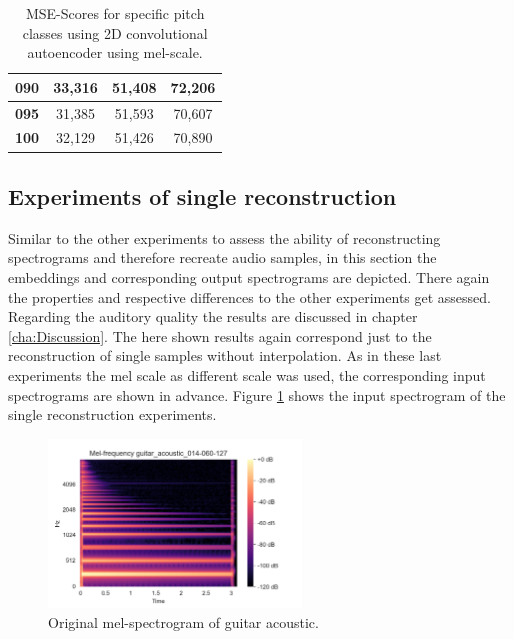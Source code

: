 \begin{table}[htb!]
\begin{tabular}{|c|c|c|c|}
\textbf{090}   & 33,316                 & 51,408                 & 72,206                 \\ \hline
\textbf{095}   & 31,385                 & 51,593                 & 70,607                 \\ \hline
\textbf{100}   & 32,129                 & 51,426                 & 70,890                 \\ \hline
\end{tabular}
\caption{MSE-Scores for specific pitch classes using 2D convolutional autoencoder using mel-scale.}
\label{tab:res_scores_2D_pitch_mel}
\end{table}

\subsection{Experiments of single reconstruction}
Similar to the other experiments to assess the ability of reconstructing spectrograms and therefore recreate audio samples, in this section the embeddings and corresponding output spectrograms are depicted. There again the properties and respective differences to the other experiments get assessed. Regarding the auditory quality the results are discussed in chapter \ref{cha:Discussion}. The here shown results again correspond just to the reconstruction of single samples without interpolation. As in these last experiments the mel scale as different scale was used, the corresponding input spectrograms are shown in advance. Figure \ref{fig:res_2D_mel_guit} shows the input spectrogram of the single reconstruction experiments.

\begin{figure}[htb!]
    \centering
    \includegraphics[width=0.60\textwidth]{images/results/mel_guitar_acoustic_014-060-127.png}
    \caption{Original mel-spectrogram of guitar acoustic.}
    \label{fig:res_2D_mel_guit}
\end{figure}

